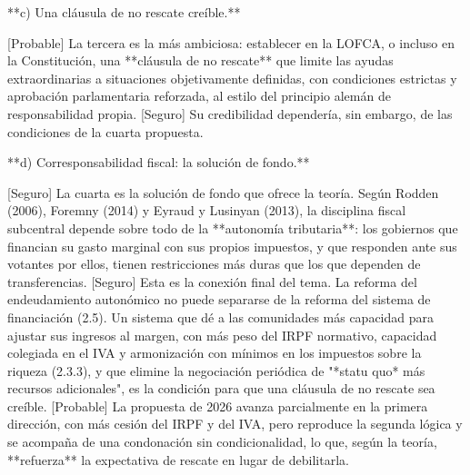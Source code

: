 \documentclass[10pt,a4paper]{article}
\begin{document}
**c) Una cláusula de no rescate creíble.**

[Probable] La tercera es la más ambiciosa: establecer en la LOFCA, o incluso en la Constitución, una **cláusula de no rescate** que limite las ayudas extraordinarias a situaciones objetivamente definidas, con condiciones estrictas y aprobación parlamentaria reforzada, al estilo del principio alemán de responsabilidad propia. [Seguro] Su credibilidad dependería, sin embargo, de las condiciones de la cuarta propuesta.

**d) Corresponsabilidad fiscal: la solución de fondo.**

[Seguro] La cuarta es la solución de fondo que ofrece la teoría. Según Rodden (2006), Foremny (2014) y Eyraud y Lusinyan (2013), la disciplina fiscal subcentral depende sobre todo de la **autonomía tributaria**: los gobiernos que financian su gasto marginal con sus propios impuestos, y que responden ante sus votantes por ellos, tienen restricciones más duras que los que dependen de transferencias. [Seguro] Esta es la conexión final del tema. La reforma del endeudamiento autonómico no puede separarse de la reforma del sistema de financiación (2.5). Un sistema que dé a las comunidades más capacidad para ajustar sus ingresos al margen, con más peso del IRPF normativo, capacidad colegiada en el IVA y armonización con mínimos en los impuestos sobre la riqueza (2.3.3), y que elimine la negociación periódica de "*statu quo* más recursos adicionales", es la condición para que una cláusula de no rescate sea creíble. [Probable] La propuesta de 2026 avanza parcialmente en la primera dirección, con más cesión del IRPF y del IVA, pero reproduce la segunda lógica y se acompaña de una condonación sin condicionalidad, lo que, según la teoría, **refuerza** la expectativa de rescate en lugar de debilitarla.
\end{document}
